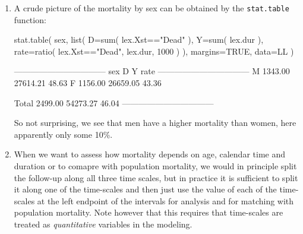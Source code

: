 \begin{enumerate}
\item A crude picture of the mortality by sex can be obtained by
  the \texttt{stat.table} function:
\begin{Schunk}
\begin{Sinput}
 stat.table( sex,
             list( D=sum( lex.Xst=="Dead" ),
                   Y=sum( lex.dur ),
                rate=ratio( lex.Xst=="Dead", lex.dur, 1000 ) ),
             margins=TRUE,
             data=LL )
\end{Sinput}
\begin{Soutput}
 --------------------------------- 
 sex           D        Y    rate  
 --------------------------------- 
 M       1343.00 27614.21   48.63  
 F       1156.00 26659.05   43.36  
                                   
 Total   2499.00 54273.27   46.04  
 --------------------------------- 
\end{Soutput}
\end{Schunk}
  So not surprising, we see that men have a higher mortality than
  women, here apparently only some 10\%.


  
\item When we want to assess how mortality depends on age, calendar
  time and duration or to comapre with population mortality, we would
  in principle split the follow-up along all three time scales, but in
  practice it is sufficient to split it along one of the time-scales
  and then just use the value of each of the time-scales at the left
  endpoint of the intervals for analysis and for matching with
  population mortality. Note however that this requires that
  time-scales are treated as \emph{quantitative} variables in the
  modeling.


\end{enumerate}
